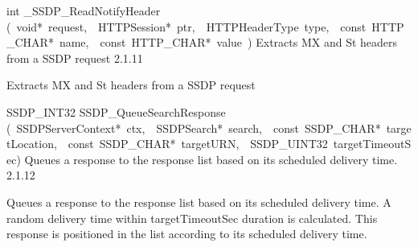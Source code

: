 \documentclass{article}
\begin{document}
\begin{cxxentry}
\begin{cxxentry}
\begin{cxxfunction}
\begin{cxxdoc}
\end{cxxdoc}
\end{cxxfunction}
\begin{cxxfunction}
{int}
        {\_SSDP\_ReadNotifyHeader}
        {(\ void*\ request,\ \ HTTPSession*\ ptr,\ \ HTTPHeaderType\ type,\ \ const\ HTTP\_CHAR*\ name,\ \ const\ HTTP\_CHAR*\ value\ )}
        {Extracts MX and St headers from a SSDP request}
        {2.1.11}
\begin{cxxdoc}
Extracts MX and St headers from a SSDP request


\end{cxxdoc}
\end{cxxfunction}
\begin{cxxfunction}
{SSDP\_INT32}
        {SSDP\_QueueSearchResponse}
        {(\ SSDPServerContext*\ ctx,\ \ SSDPSearch*\ search,\ \ const\ SSDP\_CHAR*\ targetLocation,\ \ const\ SSDP\_CHAR*\ targetURN,\ \ SSDP\_UINT32\ targetTimeoutSec)}
        {Queues a response to the response list based on its scheduled delivery time.}
        {2.1.12}
\begin{cxxdoc}
Queues a response to the response list based on its scheduled delivery time.
A random delivery time within targetTimeoutSec duration is calculated.
This response is positioned in the list according to its scheduled delivery time.



\end{cxxdoc}
\end{cxxfunction}
\end{cxxentry}
\end{cxxentry}
\end{document}
